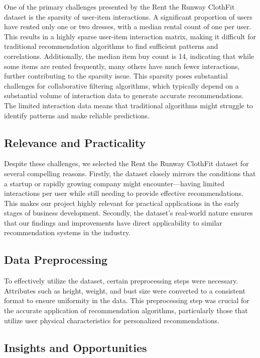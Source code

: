 \documentclass[conference]{IEEEtran}
\begin{document}
One of the primary challenges presented by the Rent the Runway ClothFit dataset is the sparsity of user-item interactions. A significant proportion of users have rented only one or two dresses, with a median rental count of one per user. This results in a highly sparse user-item interaction matrix, making it difficult for traditional recommendation algorithms to find sufficient patterns and correlations. Additionally, the median item buy count is 14, indicating that while some items are rented frequently, many others have much fewer interactions, further contributing to the sparsity issue. This sparsity poses substantial challenges for collaborative filtering algorithms, which typically depend on a substantial volume of interaction data to generate accurate recommendations. The limited interaction data means that traditional algorithms might struggle to identify patterns and make reliable predictions.

\subsection{Relevance and Practicality}

Despite these challenges, we selected the Rent the Runway ClothFit dataset for several compelling reasons. Firstly, the dataset closely mirrors the conditions that a startup or rapidly growing company might encounter---having limited interactions per user while still needing to provide effective recommendations. This makes our project highly relevant for practical applications in the early stages of business development. Secondly, the dataset's real-world nature ensures that our findings and improvements have direct applicability to similar recommendation systems in the industry.

\subsection{Data Preprocessing}

To effectively utilize the dataset, certain preprocessing steps were necessary. Attributes such as height, weight, and bust size were converted to a consistent format to ensure uniformity in the data. This preprocessing step was crucial for the accurate application of recommendation algorithms, particularly those that utilize user physical characteristics for personalized recommendations.

\subsection{Insights and Opportunities}
\end{document}
